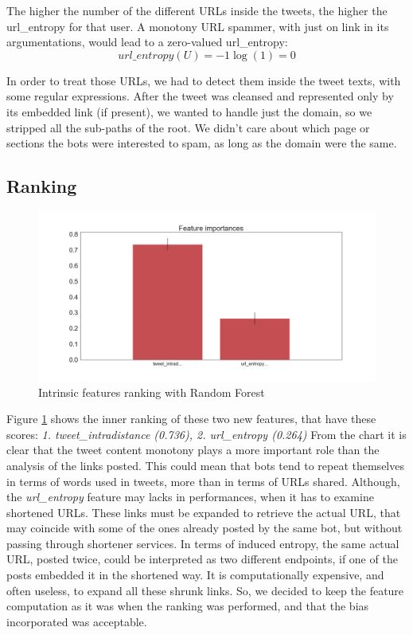 The higher the number of the different URLs inside the tweets, the higher the url\_entropy for that user.
A monotony URL spammer, with just on link in its argumentations, would lead to a zero-valued url\_entropy:
\[url\_entropy(U) = -1\log(1) = 0\]

In order to treat those URLs, we had to detect them inside the tweet texts, with some regular expressions. After the tweet was cleansed and represented only by its embedded link (if present), we wanted to handle just the domain, so we stripped all the sub-paths of the root.
We didn't care about which page or sections the bots were interested to spam, as long as the domain were the same.

\subsection{Ranking}
\begin{figure}[htp!]
	\centering
	\includegraphics[width=\columnwidth]{chapter4/figure/intrinsic_features_importances.png}
	\caption{Intrinsic features ranking with Random Forest}
	\label{fig:intr_rank}
\end{figure}
Figure \ref{fig:intr_rank} shows the inner ranking of these two new features, that have these scores:
\textit{1. tweet\_intradistance (0.736), 2. url\_entropy (0.264)}
From the chart it is clear that the tweet content monotony plays a more important role than the analysis of the links posted. This could mean that bots tend to repeat themselves in terms of words used in tweets, more than in terms of URLs shared.
Although, the  \textit{url\_entropy} feature may lacks in performances, when it has to examine shortened URLs. These links must be expanded to retrieve the actual URL, that may coincide with some of the ones already posted by the same bot, but without passing through shortener services. In terms of induced entropy, the same actual URL, posted twice, could be interpreted as two different endpoints, if one of the posts embedded it in the shortened way. It is computationally expensive, and often useless, to expand all these shrunk links. So, we decided to keep the feature computation as it was when the ranking was performed, and that the bias incorporated was acceptable.
